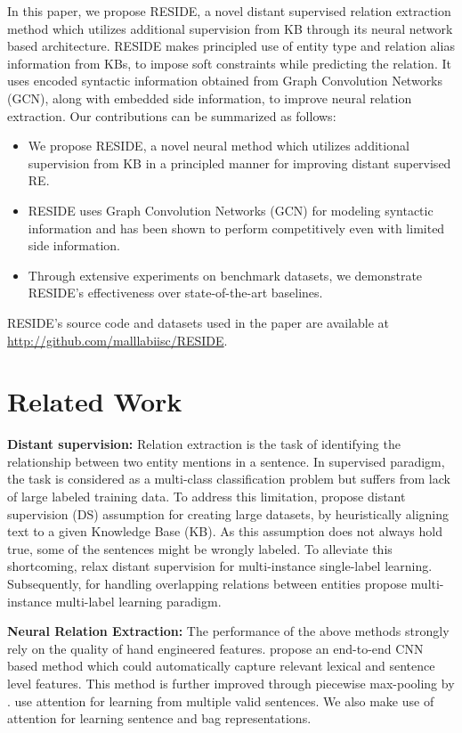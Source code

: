 \documentclass[11pt,a4paper]{article}
\newcommand{\method}{RESIDE}
\begin{document}
In this paper, we propose \method{}, a novel distant supervised relation extraction method which utilizes additional supervision from KB through its neural network based architecture.
\method{} makes principled use of entity type and relation alias information from KBs, to impose soft constraints while predicting the relation. 
It uses encoded syntactic information obtained from Graph Convolution Networks (GCN), along with embedded side information, to improve neural relation extraction.
Our contributions can be summarized as follows:
\begin{itemize}[itemsep=2pt,parsep=0pt,partopsep=0pt,leftmargin=*]
\item We propose \method{}, a novel neural method which utilizes additional supervision from KB in a principled manner for improving distant supervised RE.
	\item \method{} uses Graph Convolution Networks (GCN) for modeling syntactic information and has been shown to perform competitively even with limited side information.
\item Through extensive experiments on benchmark datasets, we demonstrate \method{}'s effectiveness over state-of-the-art baselines.
\end{itemize} 
\method{}'s source code and datasets used in the paper are available at \url{http://github.com/malllabiisc/RESIDE}. \section{Related Work}
\label{sec:related_work}

\textbf{Distant supervision:} Relation extraction is the task of identifying the relationship between two entity mentions in a sentence. In supervised paradigm, the task is considered as a multi-class classification problem but suffers from lack of large labeled training data. To address this limitation, \cite{mintz2009distant} propose distant supervision (DS) assumption for creating large datasets, by heuristically aligning text to a given Knowledge Base (KB). As this assumption does not always hold true, some of the sentences might be wrongly labeled. To alleviate this shortcoming, \citet{riedel2010modeling} relax distant supervision for multi-instance single-label learning. Subsequently, for handling overlapping relations between entities \cite{hoffmann2011knowledge,surdeanu2012multi} propose multi-instance multi-label learning paradigm. 

\textbf{Neural Relation Extraction:} The performance of the above methods strongly rely on the quality of hand engineered features. \citet{zeng2014relation} propose an end-to-end CNN based method which could automatically capture relevant lexical and sentence level features. This method is further improved through piecewise max-pooling by \cite{zeng2015distant}.
\citet{lin2016neural,candis_paper} use attention \cite{bahdanau+al-2014-nmt} for learning from multiple valid sentences. We also make use of attention for learning sentence and bag representations. 
\end{document}
